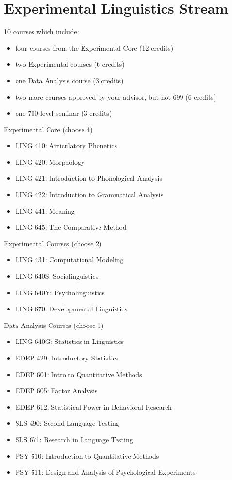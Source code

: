 \documentclass[
]{book}
\providecommand{\tightlist}{%
  \setlength{\itemsep}{0pt}\setlength{\parskip}{0pt}}
\begin{document}
\hypertarget{experimental-linguistics-stream}{%
\section{Experimental Linguistics Stream}\label{experimental-linguistics-stream}}

10 courses which include:

\begin{itemize}
\tightlist
\item
  four courses from the Experimental Core (12 credits)
\item
  two Experimental courses (6 credits)
\item
  one Data Analysis course (3 credits)
\item
  two more courses approved by your advisor, but not 699 (6 credits)
\item
  one 700-level seminar (3 credits)
\end{itemize}

Experimental Core (choose 4)

\begin{itemize}
\tightlist
\item
  LING 410: Articulatory Phonetics
\item
  LING 420: Morphology
\item
  LING 421: Introduction to Phonological Analysis
\item
  LING 422: Introduction to Grammatical Analysis
\item
  LING 441: Meaning
\item
  LING 645: The Comparative Method
\end{itemize}

Experimental Courses (choose 2)

\begin{itemize}
\tightlist
\item
  LING 431: Computational Modeling
\item
  LING 640S: Sociolinguistics
\item
  LING 640Y: Psycholinguistics
\item
  LING 670: Developmental Linguistics
\end{itemize}

Data Analysis Courses (choose 1)

\begin{itemize}
\tightlist
\item
  LING 640G: Statistics in Linguistics
\item
  EDEP 429: Introductory Statistics
\item
  EDEP 601: Intro to Quantitative Methods
\item
  EDEP 605: Factor Analysis
\item
  EDEP 612: Statistical Power in Behavioral Research
\item
  SLS 490: Second Language Testing
\item
  SLS 671: Research in Language Testing
\item
  PSY 610: Introduction to Quantitative Methods
\item
  PSY 611: Design and Analysis of Psychological Experiments
\end{itemize}
\end{document}

